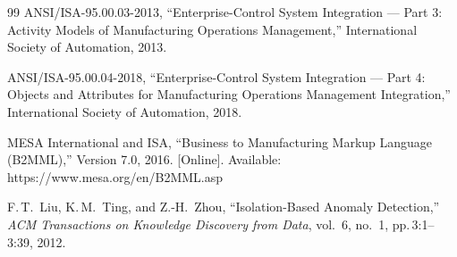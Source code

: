 \documentclass[11pt]{article}
\begin{document}
\begin{thebibliography}{99}
 ANSI/ISA-95.00.03-2013, ``Enterprise-Control System Integration --- Part 3: Activity Models of Manufacturing Operations Management,'' International Society of Automation, 2013.

 ANSI/ISA-95.00.04-2018, ``Enterprise-Control System Integration --- Part 4: Objects and Attributes for Manufacturing Operations Management Integration,'' International Society of Automation, 2018.

 MESA International and ISA, ``Business to Manufacturing Markup Language (B2MML),'' Version 7.0, 2016. [Online]. Available: https://www.mesa.org/en/B2MML.asp

 F.\,T.\ Liu, K.\,M.\ Ting, and Z.-H.\ Zhou, ``Isolation-Based Anomaly Detection,'' \textit{ACM Transactions on Knowledge Discovery from Data}, vol.~6, no.~1, pp.\,3:1--3:39, 2012.

\end{thebibliography}
\end{document}
